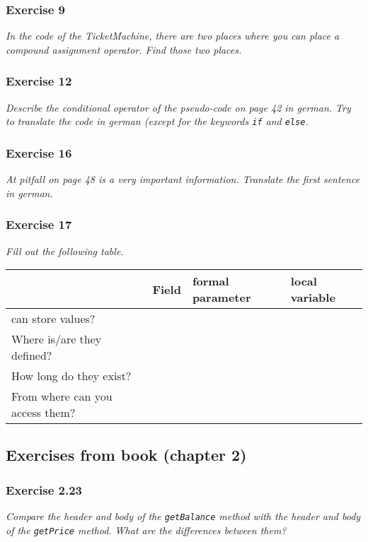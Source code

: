 \subsubsection*{Exercise 9}
\textit{In the code of the TicketMachine, there are two places where you
	can place a compound assignment operator. Find those two 
	places.}\\

\subsubsection*{Exercise 12}
\textit{Describe the conditional operator of the pseudo-code on page 42
	in german. Try to translate the code in german (except for the keywords
	\lstinline{if} and \lstinline{else}.}\\

\subsubsection*{Exercise 16}
\textit{At pitfall on page 48 is a very important information.
	Translate the first sentence in german.}\\

\subsubsection*{Exercise 17}
\textit{Fill out the following table.}\\

\begin{table}
	\centering
	\begin{tabular}{l | l | l | l}
			& \textbf{Field} 
				& \textbf{formal parameter} 
					& \textbf{local variable} \\
		\hline
		can store values? 
			&
				&
					& \\
		Where is/are they defined?
			&
				&
					& \\
		How long do they exist?
			&
				&
					& \\
		From where can you access them?
			&
				&
					& 
	\end{tabular}
\end{table}

\subsection{Exercises from book (chapter 2)}
\subsubsection*{Exercise 2.23}
\textit{Compare the header and body of the \lstinline?getBalance? method with 
the header and body of the \lstinline?getPrice? method. What are the 
differences between them? }\\

